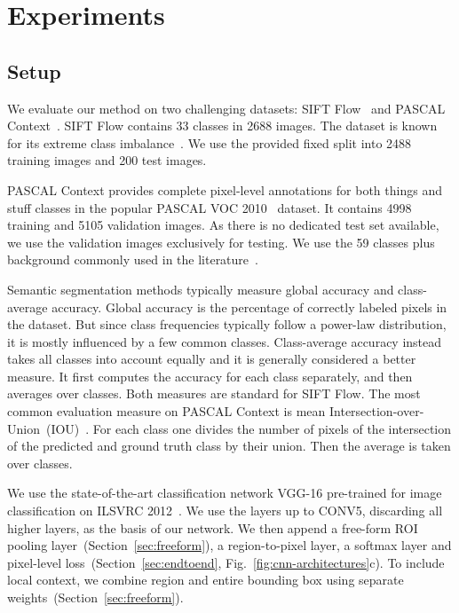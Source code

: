 \section{Experiments}
\label{sec:experiments}

\subsection{Setup}

 We evaluate our method on two challenging datasets:
SIFT Flow~\cite{liu11pami} and PASCAL Context~\cite{mottaghi14cvpr}.
SIFT Flow contains 33
classes in 2688 images.  The dataset is known for its extreme class imbalance~\cite{liu11pami,farabet13pami,eigen15iccv}.
We use the provided fixed split into 2488 training images and 200 test images.

PASCAL Context provides complete pixel-level annotations for both things and stuff classes in the popular PASCAL VOC
2010~\cite{everingham15ijcv} dataset. It contains 4998 training and 5105 validation images.  As there
is no dedicated test set available, we use the validation images exclusively for testing.  We use
the 59 classes plus background commonly used in the literature~\cite{dai15cvpr,dai15iccv,long15cvpr,zheng15iccv}.

Semantic segmentation methods typically measure global accuracy and class-average accuracy. Global accuracy is the percentage of correctly labeled pixels in the dataset. But since class frequencies typically follow a power-law
distribution, it is mostly influenced by a few common classes.
Class-average accuracy instead takes all classes into account equally and it is generally considered a better measure.
It first computes the accuracy for each class separately, and then averages over classes. Both measures are standard for SIFT Flow.
The most common evaluation measure on PASCAL Context is mean Intersection-over-Union~(IOU)~\cite{everingham15ijcv}.
For each class one divides the number of pixels of the intersection of the predicted and ground truth class by their union.
Then the average is taken over classes.

We use the state-of-the-art classification network VGG-16 \cite{simonyan15iclr}
pre-trained for image classification on ILSVRC 2012~\cite{russakovsky15ijcv}. We use the layers up to CONV5,
discarding all higher layers, as the basis of our network.
We then append a free-form ROI pooling layer~(Section~\ref{sec:freeform}),
a region-to-pixel layer, a softmax layer and pixel-level loss~(Section~\ref{sec:endtoend}, Fig.~\ref{fig:cnn-architectures}c).
To include local context, we combine region and entire bounding box using separate weights~(Section~\ref{sec:freeform}).

